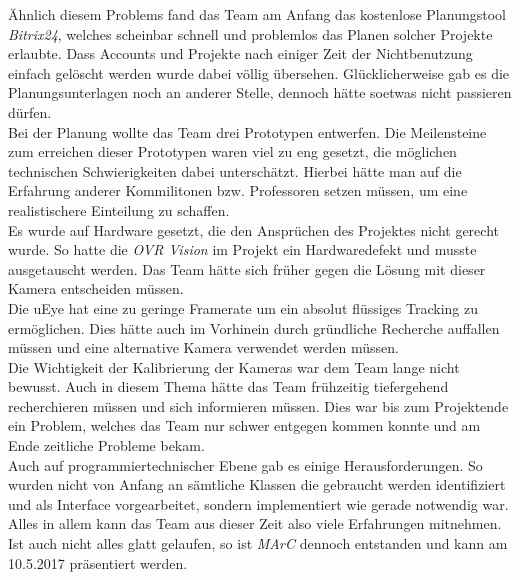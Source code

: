 Ähnlich diesem Problems fand das Team am Anfang das kostenlose Planungstool \textit{Bitrix24}, welches scheinbar schnell und problemlos das Planen solcher Projekte erlaubte. Dass Accounts und Projekte nach einiger Zeit der Nichtbenutzung einfach gelöscht werden wurde dabei völlig übersehen. Glücklicherweise gab es die Planungsunterlagen noch an anderer Stelle, dennoch hätte soetwas nicht passieren dürfen.\\
Bei der Planung wollte das Team drei Prototypen entwerfen. Die Meilensteine zum erreichen dieser Prototypen waren viel zu eng gesetzt, die möglichen technischen Schwierigkeiten dabei unterschätzt. Hierbei hätte man auf die Erfahrung anderer Kommilitonen bzw. Professoren setzen müssen, um eine realistischere Einteilung zu schaffen.\\
Es wurde auf Hardware gesetzt, die den Ansprüchen des Projektes nicht gerecht wurde. So hatte die \textit{OVR Vision} im Projekt ein Hardwaredefekt und musste ausgetauscht werden. Das Team hätte sich früher gegen die Lösung mit dieser Kamera entscheiden müssen.\\
Die uEye hat eine zu geringe Framerate um ein absolut flüssiges Tracking zu ermöglichen. Dies hätte auch im Vorhinein durch gründliche Recherche auffallen müssen und eine alternative Kamera verwendet werden müssen.\\
Die Wichtigkeit der Kalibrierung der Kameras war dem Team lange nicht bewusst. Auch in diesem Thema hätte das Team frühzeitig tiefergehend recherchieren müssen und sich informieren müssen. Dies war bis zum Projektende ein Problem, welches das Team nur schwer entgegen kommen konnte und am Ende zeitliche Probleme bekam.\\
Auch auf programmiertechnischer Ebene gab es einige Herausforderungen. So wurden nicht von Anfang an sämtliche Klassen die gebraucht werden identifiziert und als Interface vorgearbeitet, sondern implementiert wie gerade notwendig war. \\
Alles in allem kann das Team aus dieser Zeit also viele Erfahrungen mitnehmen. Ist auch nicht alles glatt gelaufen, so ist \textit{MArC} dennoch entstanden und kann am 10.5.2017 präsentiert werden.


























